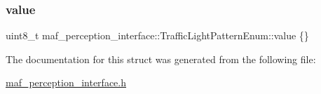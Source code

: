 \subsubsection{\texorpdfstring{value}{value}}
{\footnotesize\ttfamily uint8\+\_\+t maf\+\_\+perception\+\_\+interface\+::\+Traffic\+Light\+Pattern\+Enum\+::value \{\}}



The documentation for this struct was generated from the following file\+:\begin{DoxyCompactItemize}
\item 
\hyperlink{maf__perception__interface_8h}{maf\+\_\+perception\+\_\+interface.\+h}\end{DoxyCompactItemize}
